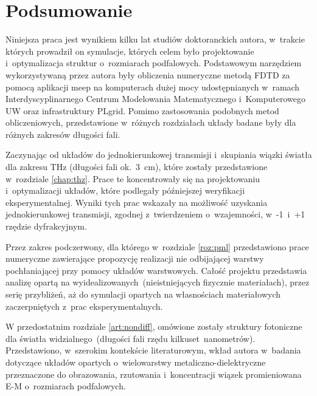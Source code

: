 \chapter{Podsumowanie}
Niniejsza praca jest wynikiem kilku lat studiów doktoranckich autora, w~trakcie których prowadził on symulacje, których celem było projektowanie i~optymalizacja struktur o~rozmiarach podfalowych. Podstawowym narzędziem wykorzystywaną przez autora były obliczenia numeryczne metodą FDTD za pomocą aplikacji meep\cite{OskooiRo10} na komputerach dużej mocy udostępnianych w~ramach Interdyscyplinarnego Centrum Modelowania Matematycznego i~Komputerowego UW oraz infrastruktury PLgrid. Pomimo zastosowania podobnych metod obliczeniowych, przedstawione w~różnych rozdziałach układy badane były dla różnych zakresów długości fali.

Zaczynając od układów do jednokierunkowej transmisji i~skupiania wiązki światła dla zakresu THz (długości fali ok.~3~cm), które zostały przedstawione w~rozdziale \ref{chap:thz}. Prace te koncentrowały się na projektowaniu i~optymalizacji układów, które podlegały późniejszej weryfikacji eksperymentalnej. Wyniki tych prac wskazały na możliwość uzyskania jednokierunkowej transmisji, zgodnej z~twierdzeniem o~wzajemności, w~-1~i~+1 rzędzie dyfrakcyjnym.

Przez zakres podczerwony, dla którego w~rozdziale \ref{roz:pml} przedstawiono prace numeryczne zawierające propozycję realizacji nie odbijającej warstwy pochłaniającej przy pomocy układów warstwowych. Całość projektu przedstawia analizę opartą na wyidealizowanych~(nieistniejących fizycznie materiałach), przez serię przybliżeń, aż do symulacji opartych na własnościach materiałowych zaczerpniętych z~prac eksperymentalnych.

W przedostatnim  rozdziale \ref{art:nondiff},  omówione zostały struktury fotoniczne dla światła widzialnego~(długości fali rzędu kilkuset~nanometrów). Przedstawiono, w~szerokim kontekście literaturowym, wkład autora w~badania dotyczące układów opartych o~wielowarstwy metaliczno-dielektryczne przeznaczone do obrazowania, rzutowania i~koncentracji wiązek promieniowana E-M o~rozmiarach podfalowych.

